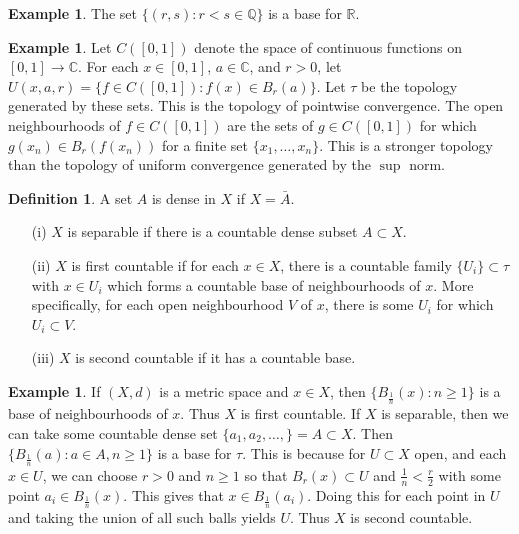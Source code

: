 \documentclass[11pt]{amsart}
\theoremstyle{definition}
\newtheorem{definition}[theorem]{Definition}
\newtheorem{example}[theorem]{Example}
\numberwithin{equation}{section}
\begin{document}
\begin{example}
    The set $\{(r,s):r<s\in \mathbb Q\}$ is a base for $\mathbb R$.
\end{example}
\begin{example}
    Let $C([0,1])$ denote the space of continuous functions on $[0,1]\to\mathbb C$. For each $x\in[0,1]$, $a\in \mathbb C$, and $r>0$, let $U(x,a,r)=\{f\in C([0,1]):f(x)\in B_r(a)\}$. Let $\tau$ be the topology generated by these sets. This is the topology of pointwise convergence. The open neighbourhoods of $f\in C([0,1])$ are the sets of $g\in C([0,1])$ for which $g(x_n)\in B_r(f(x_n))$ for a finite set $\{x_1,\ldots,x_n\}$. This is a stronger topology than the topology of uniform convergence generated by the $\sup$ norm.
\end{example}
\begin{definition}
    A set $A$ is dense in $X$ if $X=\bar A$.
    \begin{enumerate}
        \item [(i)] $X$ is separable if there is a countable dense subset $A\subset X$.
        \item [(ii)] $X$ is first countable if for each $x\in X$, there is a countable family $\{U_i\}\subset \tau$ with $x\in U_i$ which forms a countable base of neighbourhoods of $x$. More specifically, for each open neighbourhood $V$ of $x$, there is some $U_i$ for which $U_i\subset V$.
        \item [(iii)] $X$ is second countable if it has a countable base.
    \end{enumerate}
\end{definition}
\begin{example}
    If $(X,d)$ is a metric space and $x\in X$, then $\{B_{\frac{1}{n}}(x):n\ge 1\}$ is a base of neighbourhoods of $x$. Thus $X$ is first countable. If $X$ is separable, then we can take some countable dense set $\{a_1,a_2,\ldots,\}=A\subset X$. Then $\{B_{\frac{1}{n}}(a):a\in A,n\ge 1\}$ is a base for $\tau$. This is because for $U\subset X$ open, and each $x\in U$, we can choose $r>0$ and $n\ge 1$ so that $B_r(x)\subset U$ and $\frac{1}{n}<\frac{r}{2}$ with some point $a_i\in B_\frac{1}{n}(x)$. This gives that $x\in B_\frac{1}{n}(a_i)$. Doing this for each point in $U$ and taking the union of all such balls yields $U$. Thus $X$ is second countable.
\end{example}
\end{document}
